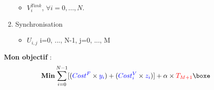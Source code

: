 \documentclass[hyperref={bookmarks=false},aspectratio=169]{beamer}
\begin{document}
\begin{frame}
\begin{minipage}{.45\textwidth}
\begin{enumerate}
\begin{itemize}
    \item  $V_i^{Tank}$, $\forall i=0, ..., N$.%
	  \end{itemize}
	\item Synchronisation
		\begin{itemize}
			\item \textcolor{greenn}{$U_{i,j}$ \forall i=0, ..., N-1, \forall j=0, ..., M}
	  \end{itemize}
\end{enumerate}

\end{minipage}%
\pause
\hfill
\begin{minipage}{.55\textwidth}%
\textbf{Mon objectif} :
\begin{equation*}
\label{d13}
\textbf{Min}	\sum_{i=0}^{N-1}[(\textcolor{blue}{Cost^F} \times \textcolor{blue}{y_i}) + (\textcolor{blue}{Cost_i^V} \times \textcolor{blue}{z_i})]+ \alpha \times \textcolor{red}{T_{M+1}}
\boxe
\end{equation*}
\end{minipage}%

\end{frame}	
	
\end{document}
